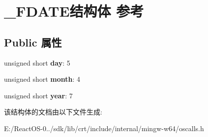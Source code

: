 \hypertarget{struct___f_d_a_t_e}{}\section{\+\_\+\+F\+D\+A\+T\+E结构体 参考}
\label{struct___f_d_a_t_e}
\subsection*{Public 属性}
\begin{DoxyCompactItemize}
\item 
\mbox{\label{struct___f_d_a_t_e_a3668140b74fe86e6455618b5825cf095}} 
unsigned short {\bfseries day}\+: 5
\item 
\mbox{\label{struct___f_d_a_t_e_aeffad5af3256c1c667116e397110b608}} 
unsigned short {\bfseries month}\+: 4
\item 
\mbox{\label{struct___f_d_a_t_e_ac27f7a43550d940ba19a687e07e06af9}} 
unsigned short {\bfseries year}\+: 7
\end{DoxyCompactItemize}


该结构体的文档由以下文件生成\+:\begin{DoxyCompactItemize}
\item 
E\+:/\+React\+O\+S-\/0../sdk/lib/crt/include/internal/mingw-\/w64/oscalls.\+h\end{DoxyCompactItemize}
